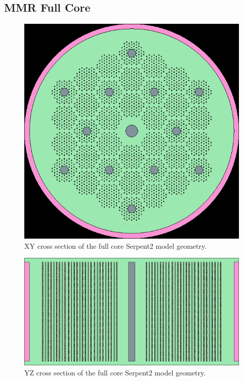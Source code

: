 \documentclass[11pt,letterpaper]{article}
\begin{document}
\subsection{MMR Full Core}
\label{sub:Full}

\begin{figure}[H]
	\centering
	\includegraphics[width=0.45\linewidth]{figures/MMR_full_stack_geom1.png}
	\hfill
	\caption{XY cross section of the full core Serpent2 model geometry.}
	\label{fig:FullXY}
\end{figure}

\begin{figure}[H]
	\centering
	\includegraphics[width=0.6\linewidth]{figures/MMR_full_stack_geom2.png}
	\hfill
	\caption{YZ cross section of the full core Serpent2 model geometry.}
	\label{fig:FullYZ}
\end{figure}

\pagebreak


\end{document}
